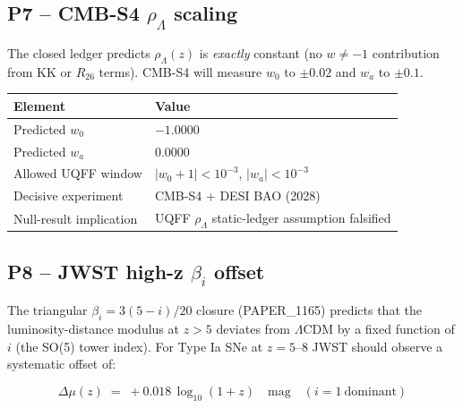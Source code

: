 \documentclass[
]{article}
\newcounter{none} %
\begin{document}
\subsection{\texorpdfstring{P7 -- CMB-S4 \(\rho_\Lambda\)
scaling}{P7 -- CMB-S4 \textbackslash rho\_\textbackslash Lambda scaling}}\label{p7-cmb-s4-rho_lambda-scaling}

The closed ledger predicts \(\rho_\Lambda(z)\) is \emph{exactly}
constant (no \(w\neq -1\) contribution from KK or \(R_{26}\) terms).
CMB-S4 will measure \(w_0\) to \(\pm 0.02\) and \(w_a\) to \(\pm 0.1\).

{\def\LTcaptype{none} %
\begin{longtable}[]{@{}
  >{\raggedright\arraybackslash}p{}
  >{\raggedright\arraybackslash}p{}@{}}
\toprule\noalign{}
\begin{minipage}[b]{\linewidth}\raggedright
Element
\end{minipage} & \begin{minipage}[b]{\linewidth}\raggedright
Value
\end{minipage} \\
\midrule\noalign{}
\endhead
\bottomrule\noalign{}
\endlastfoot
Predicted \(w_0\) & \(-1.0000\) \\
Predicted \(w_a\) & \(0.0000\) \\
Allowed UQFF window & \(|w_0+1|<10^{-3}\), \(|w_a|<10^{-3}\) \\
Decisive experiment & CMB-S4 + DESI BAO (2028) \\
Null-result implication & UQFF \(\rho_\Lambda\) static-ledger assumption
falsified \\
\end{longtable}
}

\subsection{\texorpdfstring{P8 -- JWST high-z \(\beta_i\)
offset}{P8 -- JWST high-z \textbackslash beta\_i offset}}\label{p8-jwst-high-z-beta_i-offset}

The triangular \(\beta_i = 3(5-i)/20\) closure (PAPER\_1165) predicts
that the luminosity-distance modulus at \(z>5\) deviates from
\(\Lambda\)CDM by a fixed function of \(i\) (the SO(5) tower index). For
Type Ia SNe at \(z=5\)--\(8\) JWST should observe a systematic offset
of:

\[
\Delta\mu(z) \;=\; +0.018\,\log_{10}(1+z) \quad\mathrm{mag}\quad (i=1\ \mathrm{dominant})
\]
\end{document}
